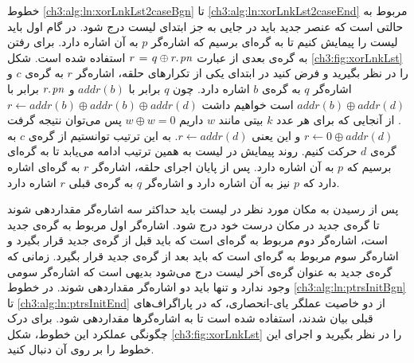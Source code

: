 خطوط {\ref{ch3:alg:ln:xorLnkLst2caseBgn}} تا {\ref{ch3:alg:ln:xorLnkLst2caseEnd}} مربوط به حالتی است که عنصر جدید باید در جایی به جز ابتدای لیست درج شود. در گام اول باید لیست را پیمایش کنیم تا به گره‌ای برسیم که اشاره‌گر {$p$} به آن اشاره دارد. برای رفتن به گره‌ی بعدی از عبارت {$r \mathrel{\hspace{1pt}=\hspace{1pt}} q \oplus r.\hspace*{1pt}\mathit{pn}$} استفاده شده است. شکل {\eqref{ch3:fig:xorLnkLst}} را در نظر بگیرید و فرض کنید در ابتدای یکی از تکرارهای حلقه، اشاره‌گر {$r$} به گره‌ی {$c$} و اشاره‌گر {$q$} به گره‌ی {$b$} اشاره دارد. چون {$q$} برابر با {$\mathit{addr}(b)$} و {$r.\hspace*{1pt}\mathit{pn}$} برابر با {$\mathit{addr}(b)\oplus \mathit{addr}(d)$} است خواهیم داشت
 {$r\gets\mathit{addr}(b)\oplus\mathit{addr}(b)\oplus\mathit{addr}(d)$}. از آنجایی که برای هر عدد {$k$} بیتی مانند {$w$} داریم {$w\oplus w=0$} پس می‌توان نتیجه گرفت {$r\gets 0\oplus \mathit{addr}(d)$} و این یعنی {$r\gets \mathit{addr}(d)$}. به این ترتیب توانستیم از گره‌ی {$c$} به گره‌ی {$d$} حرکت کنیم. روند پیمایش در لیست به همین ترتیب ادامه می‌یابد تا به گره‌ای برسیم که {$p$} به آن اشاره دارد. پس از پایان اجرای حلقه، اشاره‌گر {$r$} به گره‌ای اشاره دارد که {$p$} نیز به آن اشاره دارد و اشاره‌گر {$q$} به گره‌ی قبلی {$r$} اشاره دارد.

پس از رسیدن به مکان مورد نظر در لیست باید حداکثر سه اشاره‌گر مقداردهی شوند تا گره‌ی جدید در مکان درست خود درج شود. اشاره‌گر اول مربوط به گره‌ی جدید است، اشاره‌گر دوم مربوط به گره‌ای است که باید قبل از گره‌ی جدید قرار بگیرد و اشاره‌گر سوم مربوط به گره‌ای است که باید بعد از گره‌ی جدید قرار بگیرد. زمانی که گره‌ی جدید به عنوان گره‌ی آخر لیست درج می‌شود بدیهی است که اشاره‌گر سومی وجود ندارد و تنها باید دو اشاره‌گر مقداردهی شوند. در خطوط {\ref{ch3:alg:ln:ptrsInitBgn}} تا {\ref{ch3:alg:ln:ptrsInitEnd}} از دو خاصیت عملگر یای-انحصاری، که در پاراگراف‌های قبلی بیان شدند، استفاده شده است تا به اشاره‌گر‌ها مقداردهی شود. برای درک چگونگی عملکرد این خطوط، شکل {\eqref{ch3:fig:xorLnkLst}} را در نظر بگیرید و اجرای این خطوط را بر روی آن دنبال کنید.

